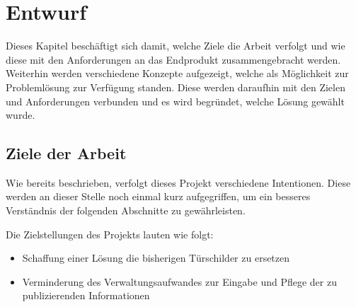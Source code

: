 \chapter{ Entwurf }
\vspace{-3cm}
\begin{flushleft}
Dieses Kapitel beschäftigt sich damit, welche Ziele die Arbeit verfolgt und wie diese mit den Anforderungen an das Endprodukt zusammengebracht werden. Weiterhin werden verschiedene Konzepte aufgezeigt, welche als Möglichkeit zur Problemlösung zur Verfügung standen. Diese werden daraufhin mit den Zielen und Anforderungen verbunden und es wird begründet, welche Lösung gewählt wurde.

\section{Ziele der Arbeit}\label{sec:Ziele der Arbeit}
Wie bereits beschrieben, verfolgt dieses Projekt verschiedene Intentionen. Diese werden an dieser Stelle noch einmal kurz aufgegriffen, um ein besseres Verständnis der folgenden Abschnitte zu gewährleisten.
\newline

Die Zielstellungen des Projekts lauten wie folgt:
\begin{itemize}
  \item Schaffung einer Lösung die bisherigen Türschilder zu ersetzen
  \item Verminderung des Verwaltungsaufwandes zur Eingabe und Pflege der zu publizierenden Informationen
\end{itemize}


\end{flushleft}

% 

